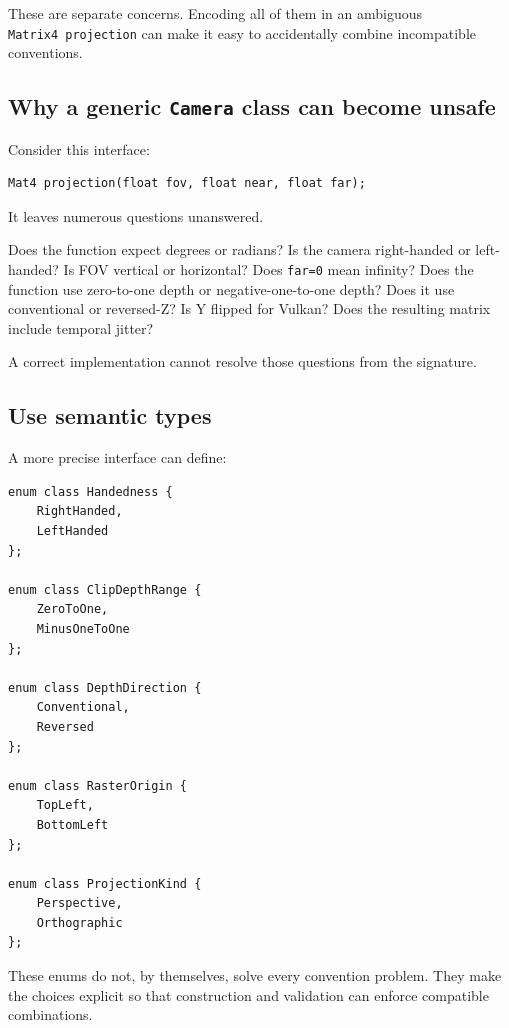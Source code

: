 These are separate concerns. Encoding all of them in an ambiguous \texttt{Matrix4\ projection} can make it easy to accidentally combine incompatible conventions.

\subsection{\texorpdfstring{Why a generic \texttt{Camera} class can become unsafe}{Why a generic Camera class can become unsafe}}\label{02-foundations-ii-ch037-why-a-generic-camera-class-can-become-unsafe}

Consider this interface:

\begin{verbatim}
Mat4 projection(float fov, float near, float far);
\end{verbatim}

It leaves numerous questions unanswered.

Does the function expect degrees or radians? Is the camera right-handed or left-handed? Is FOV vertical or horizontal? Does \texttt{far=0} mean infinity? Does the function use zero-to-one depth or negative-one-to-one depth? Does it use conventional or reversed-Z? Is Y flipped for Vulkan? Does the resulting matrix include temporal jitter?

A correct implementation cannot resolve those questions from the signature.

\subsection{Use semantic types}\label{02-foundations-ii-ch037-use-semantic-types}

A more precise interface can define:

\begin{verbatim}
enum class Handedness {
    RightHanded,
    LeftHanded
};

enum class ClipDepthRange {
    ZeroToOne,
    MinusOneToOne
};

enum class DepthDirection {
    Conventional,
    Reversed
};

enum class RasterOrigin {
    TopLeft,
    BottomLeft
};

enum class ProjectionKind {
    Perspective,
    Orthographic
};
\end{verbatim}

These enums do not, by themselves, solve every convention problem. They make the choices explicit so that construction and validation can enforce compatible combinations.

